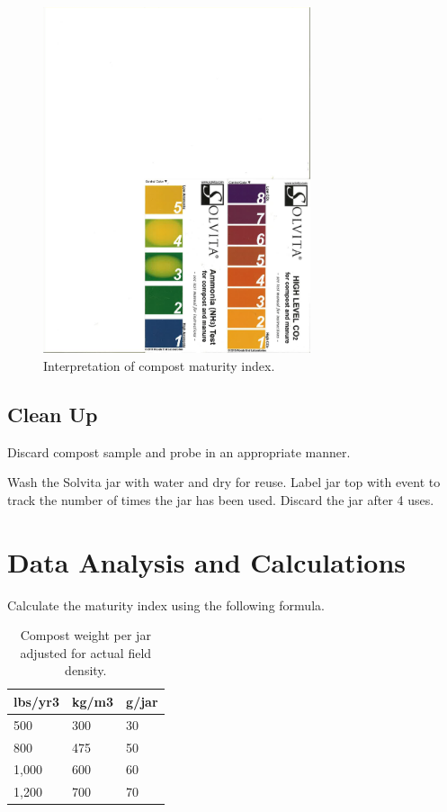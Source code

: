\documentclass[12pt]{../SOP4_alpha}\usepackage[]{graphicx}\usepackage[]{xcolor}
\begin{document}
\begin{figure}[ht]
\centering
\includegraphics[width=0.70\textwidth]{graphics/Solvita_Color_Chart_NH3_CO2}
\caption{Interpretation of compost maturity index.}
\label{fig:CompostMaturity}
\end{figure}

\subsection{Clean Up}

\NP Discard compost sample and probe in an appropriate manner.

\NP Wash the Solvita jar with water and dry for reuse. Label jar top with event to track the number of times the jar has been used. Discard the jar after 4 uses.

\section{Data Analysis and Calculations}

\NP Calculate the maturity index using the following formula.

\begin{table}[ht]
\caption{Compost weight per jar adjusted for actual field density.}
\label{tab:jarweight}
\centering
\begin{tabular}{lll}
  \hline
 \textbf{lbs/yr3} & \textbf{kg/m3} & \textbf{g/jar} \\ 
  \hline \hline
  500   & 300   & 30 \\
  800   & 475   & 50 \\
  1,000 & 600   & 60 \\
  1,200 & 700   & 70 \\ \hline
\end{tabular}
\end{table}
\end{document}
